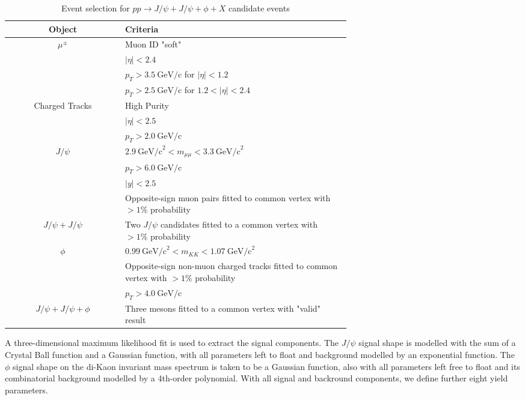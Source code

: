 \documentclass[10pt,twocolumn]{article}
\newcommand*{\GeVc}{~\text{GeV/c}}
\newcommand*{\GeVcs}{~\text{GeV/c}^2}
\begin{document}
\begin{table}[]
    \centering
    \caption{Event selection for $pp\to J/\psi+J/\psi+\phi+X$ candidate events\\}
    \begin{tabular}{c p{0.66\linewidth}}
        \toprule
        \textbf{Object} & \textbf{Criteria} \\
        \midrule
        $\mu^\pm $ & Muon ID "soft" \\
                  & $|\eta| < 2.4$ \\
                  & $p_T > 3.5\GeVc$ for $|\eta| < 1.2$ \\
                  & $p_T > 2.5\GeVc$ for $1.2 < |\eta| < 2.4$ \\
                  \midrule
        Charged Tracks & High Purity \\
                  & $|\eta|<2.5$ \\
                  & $p_T > 2.0 \GeVc$ \\
        \midrule
        $J/\psi$ & $2.9 \GeVcs < m_{\mu\mu} < 3.3 \GeVcs$ \\
                 & $p_T > 6.0\GeVc$ \\
                 & $|y| < 2.5$ \\
                 & Opposite-sign muon pairs fitted to common vertex with $> 1\%$ probability \\
                 \midrule
        $J/\psi+J/\psi$ & Two $J/\psi$ candidates fitted to a common vertex with $> 1\%$ probability \\
        \midrule
        $\phi$ & $0.99 \GeVcs < m_{KK} < 1.07 \GeVcs$ \\
               & Opposite-sign non-muon charged tracks fitted to common vertex with $> 1\%$ probability \\
               & $p_T > 4.0\GeVc$ \\
               \midrule
        $J/\psi+J/\psi+\phi$ & Three mesons fitted to a common vertex with "valid" result \\
        \bottomrule
    \end{tabular}
    \label{tab:cut_JpsiJpsiPhi}
\end{table}

A three-dimensional maximum likelihood fit is used to extract the signal components. The $J/\psi$ signal shape is modelled with the sum of a Crystal Ball function and a Gaussian function, with all parameters left to float and background modelled by an exponential function. The $\phi$ signal shape on the di-Kaon invariant mass spectrum is taken to be a Gaussian function, also with all parameters left free to float and its combinatorial background modelled by a 4th-order polynomial. With all signal and backround components, we define further eight yield parameters.
\end{document}
